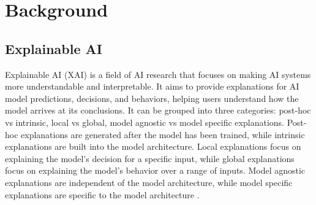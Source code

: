 \documentclass[../report.tex]{subfiles}
\begin{document}
    \section{Background}
    \label{sec:background}

    \subsection{Explainable AI}
    Explainable AI (XAI) is a field of AI research that focuses on making AI systems more understandable and interpretable. It aims to provide explanations for AI model predictions, decisions, and behaviors, helping users understand how the model arrives at its conclusions. It can be grouped into three categories: post-hoc vs intrinsic, local vs global, model agnostic vs model specific explanations. Post-hoc explanations are generated after the model has been trained, while intrinsic explanations are built into the model architecture. Local explanations focus on explaining the model's decision for a specific input, while global explanations focus on explaining the model's behavior over a range of inputs. Model agnostic explanations are independent of the model architecture, while model specific explanations are specific to the model architecture  \cite{molnar2020interpretable}. 
\end{document}
